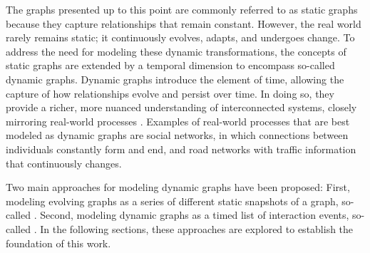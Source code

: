 The graphs presented up to this point are commonly referred to as static graphs \cite{kazemi_representation_2019, rossi_temporal_2020, you_roland_2022} because they capture relationships that remain constant. However, the real world rarely remains static; it continuously evolves, adapts, and undergoes change. To address the need for modeling these dynamic transformations, the concepts of static graphs are extended by a temporal dimension to encompass so-called dynamic graphs. Dynamic graphs introduce the element of time, allowing the capture of how relationships evolve and persist over time. In doing so, they provide a richer, more nuanced understanding of interconnected systems, closely mirroring real-world processes \cite{you_roland_2022, xu_inductive_2020, trivedi_dyrep_2019}. Examples of real-world processes that are best modeled as dynamic graphs are social networks, in which connections between individuals constantly form and end, and road networks with traffic information that continuously changes.

Two main approaches for modeling dynamic graphs have been proposed: First, modeling evolving graphs as a series of different static snapshots of a graph, so-called  \cite{he_explainer_2022, xie_explaining_2022}. Second, modeling dynamic graphs as a timed list of interaction events, so-called  \cite{rossi_temporal_2020, trivedi_dyrep_2019}. In the following sections, these approaches are explored to establish the foundation of this work.

\newpage

